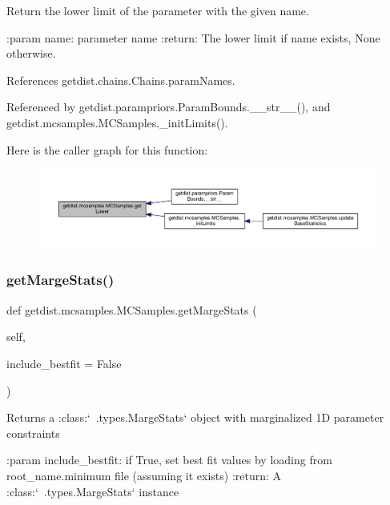 \begin{DoxyVerb}Return the lower limit of the parameter with the given name.

:param name: parameter name
:return: The lower limit if name exists, None otherwise.
\end{DoxyVerb}
 

References getdist.\+chains.\+Chains.\+param\+Names.



Referenced by getdist.\+parampriors.\+Param\+Bounds.\+\_\+\+\_\+str\+\_\+\+\_\+(), and getdist.\+mcsamples.\+M\+C\+Samples.\+\_\+init\+Limits().

Here is the caller graph for this function\+:
\nopagebreak
\begin{figure}[H]
\begin{center}
\leavevmode
\includegraphics[width=350pt]{classgetdist_1_1mcsamples_1_1MCSamples_ae742dde5f50c4a3acd861a011198fb7a_icgraph}
\end{center}
\end{figure}
\mbox{\label{classgetdist_1_1mcsamples_1_1MCSamples_ac23f96add8b4fc35b7dd3a922fae119f}} 
\subsubsection{\texorpdfstring{get\+Marge\+Stats()}{getMargeStats()}}
{\footnotesize\ttfamily def getdist.\+mcsamples.\+M\+C\+Samples.\+get\+Marge\+Stats (\begin{DoxyParamCaption}\item[{}]{self,  }\item[{}]{include\+\_\+bestfit = {\ttfamily False} }\end{DoxyParamCaption})}

\begin{DoxyVerb}Returns a :class:`~.types.MargeStats` object with marginalized 1D parameter constraints

:param include_bestfit: if True, set best fit values by loading from root_name.minimum file (assuming it exists)
:return: A :class:`~.types.MargeStats` instance
\end{DoxyVerb}
 

